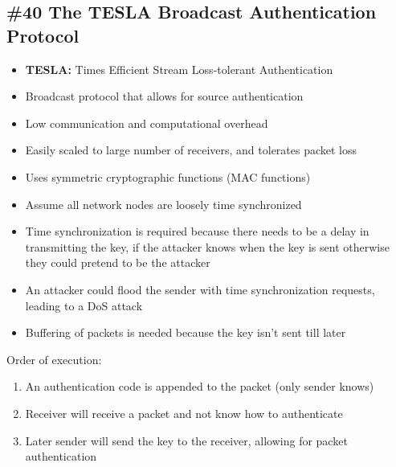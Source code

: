 \subsection{\#40 The TESLA Broadcast Authentication Protocol}
\begin{itemize}
	\item \textbf{TESLA:} Times Efficient Stream Loss-tolerant Authentication
	\item Broadcast protocol that allows for source authentication
	\item Low communication and computational overhead
	\item Easily scaled to large number of receivers, and tolerates packet loss
	\item Uses symmetric  cryptographic functions (MAC functions)
	\item Assume all network nodes are loosely time synchronized
	\item Time synchronization is required because there needs to be a delay in transmitting the key, if the attacker knows when the key is sent otherwise they could pretend to be the attacker
	\item An attacker could flood the sender with time synchronization requests, leading to a DoS attack
	\item Buffering of packets is needed because the key isn't sent till later
\end{itemize}
Order of execution:
\begin{enumerate}
	\item An authentication code is appended to the packet (only sender knows)
	\item Receiver will receive a packet and not know how to authenticate
	\item Later sender will send the key to the receiver, allowing for packet authentication
\end{enumerate}